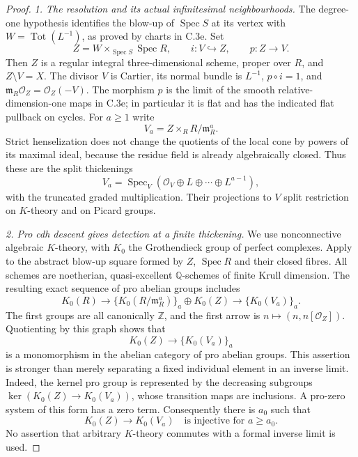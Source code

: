 \begin{proof}
\emph{1. The resolution and its actual infinitesimal neighbourhoods.}
The degree-one hypothesis identifies the blow-up of
$\operatorname{Spec}S$ at its vertex with
$W=\operatorname{Tot}(L^{-1})$, as proved by charts in C.3e.
Set
\[
 Z=W\times_{\operatorname{Spec}S}\operatorname{Spec}R,
 \qquad i:V\hookrightarrow Z,
 \qquad p:Z\longrightarrow V.
\]
Then $Z$ is a regular integral three-dimensional scheme, proper
over $R$, and $Z\setminus V=X$. The divisor $V$ is Cartier,
its normal bundle is $L^{-1}$, $p\circ i=1$, and
$\mathfrak m_R\mathcal O_Z=\mathcal O_Z(-V)$.
The morphism $p$ is the limit of the smooth relative-dimension-one
maps in C.3e; in particular it is flat and has the indicated
flat pullback on cycles. For $a\ge1$ write
\[
 V_a=Z\times_R R/\mathfrak m_R^a.
\]
Strict henselization does not change the quotients of the local
cone by powers of its maximal ideal, because the residue field
is already algebraically closed. Thus these are the split
thickenings
\begin{equation}\label{eq:C3ab-split-thickenings}
 V_a=\operatorname{Spec}_V
       (\mathcal O_V\oplus L\oplus\cdots\oplus L^{a-1}),
\end{equation}
with the truncated graded multiplication. Their projections to
$V$ split restriction on $K$-theory and on Picard groups.

\emph{2. Pro cdh descent gives detection at a finite thickening.}
We use nonconnective algebraic $K$-theory, with $K_0$ the
Grothendieck group of perfect complexes. Apply
\citet[Theorem 3.7(i), author pp.~21--22]{D_Morrow2016}
to the abstract blow-up square formed by $Z$, $\operatorname{Spec}R$
and their closed fibres. All schemes are noetherian,
quasi-excellent $\mathbb Q$-schemes of finite Krull dimension.
The resulting exact sequence of pro abelian groups includes
\[
 K_0(R)\longrightarrow
 \{K_0(R/\mathfrak m_R^a)\}_a\oplus K_0(Z)
 \longrightarrow\{K_0(V_a)\}_a.
\]
The first groups are all canonically $\mathbb Z$, and the first
arrow is $n\mapsto(n,n[\mathcal O_Z])$. Quotienting by this graph
shows that
\begin{equation}\label{eq:C3ab-pro-monomorphism}
 K_0(Z)\longrightarrow\{K_0(V_a)\}_a
\end{equation}
is a monomorphism in the abelian category of pro abelian groups.
This assertion is stronger than merely separating a fixed
individual element in an inverse limit. Indeed, the kernel pro
group is represented by the decreasing subgroups
$\ker(K_0(Z)\to K_0(V_a))$, whose transition maps are inclusions.
A pro-zero system of this form has a zero term. Consequently
there is $a_0$ such that
\begin{equation}\label{eq:C3ab-finite-detection}
 K_0(Z)\longrightarrow K_0(V_a)\quad\text{is injective for }a\ge a_0.
\end{equation}
No assertion that arbitrary $K$-theory commutes with a formal
inverse limit is used.


\end{proof}

